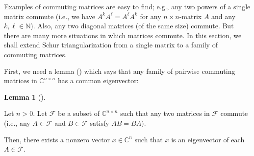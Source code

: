 \documentclass[numbers=enddot,12pt,final,onecolumn,notitlepage]{scrartcl}%
\numberwithin{exer}{subsection}
\theoremstyle{definition}
\newtheorem{lem}[theo]{Lemma}
\newenvironment{lemma}[1][]
{\begin{lem}[#1]\begin{leftbar}}
{\end{leftbar}\end{lem}}
\begin{document}
Examples of commuting matrices are easy to find; e.g., any two powers of a
single matrix commute (i.e., we have $A^{k}A^{\ell}=A^{\ell}A^{k}$ for any
$n\times n$-matrix $A$ and any $k,\ell\in\mathbb{N}$). Also, any two diagonal
matrices (of the same size) commute. But there are many more situations in
which matrices commute. In this section, we shall extend Schur
triangularization from a single matrix to a family of commuting matrices.

First, we need a lemma (\cite[Lemma 1.3.19]{HorJoh13}) which says that any
family of pairwise commuting matrices in $\mathbb{C}^{n\times n}$ has a common eigenvector:

\begin{lemma}
\label{lem.schurtri.commute.1}Let $n>0$. Let $\mathcal{F}$ be a subset of
$\mathbb{C}^{n\times n}$ such that any two matrices in $\mathcal{F}$ commute
(i.e., any $A\in\mathcal{F}$ and $B\in\mathcal{F}$ satisfy $AB=BA$).

Then, there exists a nonzero vector $x\in\mathbb{C}^{n}$ such that $x$ is an
eigenvector of each $A\in\mathcal{F}$.
\end{lemma}
\end{document}
